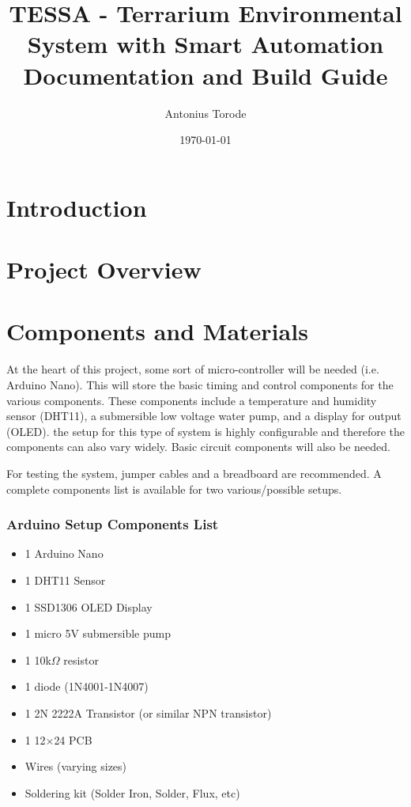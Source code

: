 \documentclass{article}
\title{TESSA - Terrarium Environmental System with Smart Automation\\
	Documentation and Build Guide}
\author{Antonius Torode}
\date{\today}
\begin{document}
	
	\maketitle
	
	\tableofcontents
	
	
	\newpage
	
	\begin{abstract}
		\lipsum[1]
	\end{abstract}
	
	\begin{multicols}{2} %
		
		\section{Introduction}
		\lipsum[2-4]
		
		\section{Project Overview}
		\lipsum[5-7]
		
		\section{Components and Materials}
		
		At the heart of this project, some sort of micro-controller will be needed (i.e. Arduino Nano). This will store the basic timing and control components for the various components. These components include a temperature and humidity sensor (DHT11), a submersible low voltage water pump, and a display for output (OLED). the setup for this type of system is highly configurable and therefore the components can also vary widely. Basic circuit components will also be needed.
		
		For testing the system, jumper cables and a breadboard are recommended. A complete components list is available for two various/possible setups.
		
		\subsubsection{Arduino Setup Components List}
		\begin{itemize}[itemsep=1pt, parsep=1pt]
			\item 1 Arduino Nano
			\item 1 DHT11 Sensor
			\item 1 SSD1306 OLED Display
			\item 1 micro 5V submersible pump
			\item 1 10k$\Omega$ resistor
			\item 1 diode (1N4001-1N4007)
			\item 1 2N 2222A Transistor (or similar NPN transistor)
			\item 1 12$\times$24 PCB
			\item Wires (varying sizes)
			\item Soldering kit (Solder Iron, Solder, Flux, etc)
		\end{itemize}
		

\end{multicols}
\end{document}
